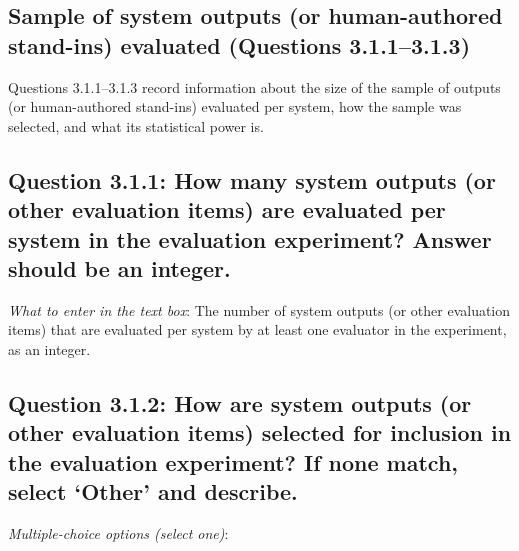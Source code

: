 \documentclass[11pt,a4paper]{article}
\begin{document}
\subsection{Sample of system outputs (or human-authored stand-ins) evaluated (Questions 3.1.1--3.1.3)}

Questions 3.1.1--3.1.3 record information about the size of the sample of outputs (or human-authored stand-ins) evaluated per system, how the sample was selected, and what its statistical power is.

\vspace{-.3cm}
\subsection*{Question 3.1.1: How many system outputs (or other evaluation items) are evaluated per system in the evaluation experiment? Answer should be an integer.}

\noindent\textit{What to enter in the text box}: The number of system outputs (or other evaluation items) that are evaluated per system by at least one evaluator in the experiment, as an integer.

\vspace{-.3cm}
\subsection*{Question 3.1.2: How are system outputs (or other evaluation items) selected for inclusion in the evaluation experiment? If none match, select `Other' and describe.}

\noindent\textit{Multiple-choice options (select one)}:  
\vspace{-.1cm}
\end{document}
